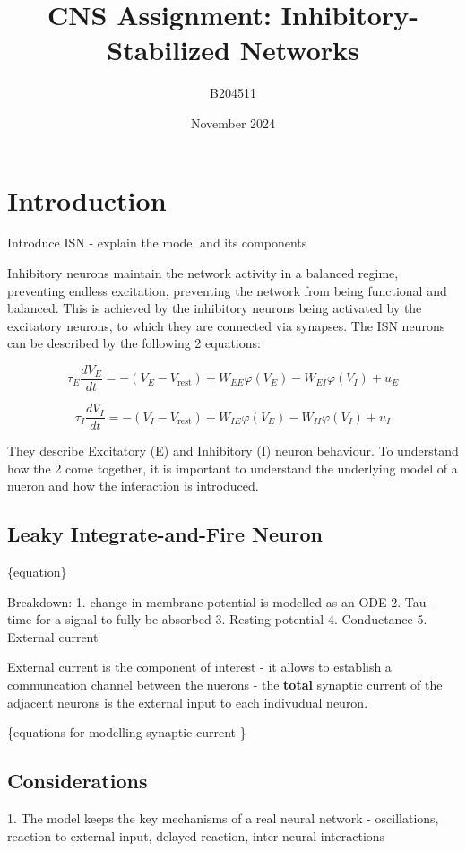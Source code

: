 \documentclass{article}
\begin{document}
\title{CNS Assignment: Inhibitory-Stabilized Networks}
\author{B204511}
\date{November 2024}
\maketitle

\section{Introduction}
Introduce ISN - explain the model and its components

Inhibitory neurons maintain the network activity in a balanced
regime, preventing endless excitation, preventing the network from 
being functional and balanced. This is achieved by the
inhibitory neurons being activated by the excitatory neurons, to which they
are connected via synapses.
The ISN neurons can be described by the following 2 equations:

\begin{equation}
    \tau_E \frac{dV_E}{dt} = 
    -(V_E - V_{\text{rest}}) 
    + W_{EE} \varphi(V_E) 
    - W_{EI} \varphi(V_I) + u_E
\end{equation}

\begin{equation}
    \tau_I \frac{dV_I}{dt} = 
    -(V_I - V_{\text{rest}}) 
    + W_{IE} \varphi(V_E) 
    - W_{II} \varphi(V_I) + u_I
\end{equation}

They describe Excitatory (E) and Inhibitory (I) neuron behaviour.
To understand how the 2 come together, it is important to understand 
the underlying model of a nueron and how the interaction is introduced.

\subsection{Leaky Integrate-and-Fire Neuron}
\{equation\}

Breakdown:
1. change in membrane potential is modelled as an ODE 
2. Tau - time for a signal to fully be absorbed
3. Resting potential
4. Conductance
5. External current

External current is the component of interest - it allows
to establish a communcation channel between the nuerons - 
the \textbf{total} synaptic current of the adjacent neurons 
is the external input to each indivudual neuron.

\{equations for modelling synaptic current \}

\subsection{Considerations}
1. The model keeps the key mechanisms of a real neural network - oscillations, 
reaction to external input, delayed reaction, inter-neural interactions
\end{document}
